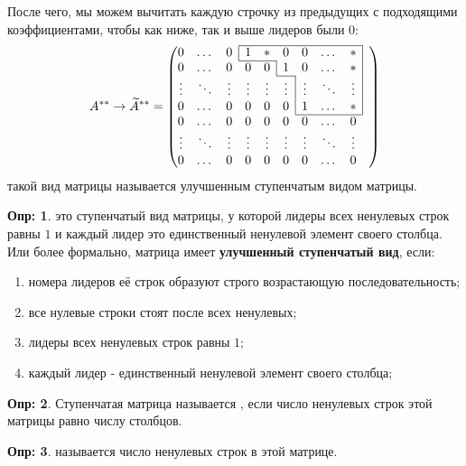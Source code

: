 \documentclass[12pt]{article}
\theoremstyle{definition}
\newtheorem{defn}{Опр:}
\newcommand{\wte}[1]{\widetilde{#1}}
\begin{document}
После чего, мы можем вычитать каждую строчку из предыдущих с подходящими коэффициентами, чтобы как ниже, так и выше лидеров были $0$:
$$
	A^{**} \to \wte{A}^{**} =  
	\begin{pmatrix} \cline{4-9}
		0 & \dotsc & 0 & \multicolumn{1}{|c}{1} & * & 0 & 0 & \dotsc & \multicolumn{1}{c|}{*} & \\ \cline{4-5}
		0 & \dotsc & 0 & 0 & 0 & \multicolumn{1}{|c}{1} & 0 &\dotsc & \multicolumn{1}{c|}{*} & \\  \cline{6-6}
		\vdots & \ddots & \vdots & \vdots & \vdots & \vdots & \multicolumn{1}{|c}{\vdots} & \ddots & \multicolumn{1}{c|}{\vdots} & \\ 
		0 & \dotsc & 0 & 0 & 0 & 0 & \multicolumn{1}{|c}{1} & \dotsc & \multicolumn{1}{c|}{*} & \\ \cline{7-9}
		0 & \dotsc & 0 & 0 & 0 & 0 & 0 & \dotsc & 0 &\\  
		\vdots & \ddots & \vdots & \vdots & \vdots & \vdots & \vdots & \ddots & \vdots& \\  
		0 & \dotsc & 0 & 0 & 0 & 0 & 0 & \dotsc & 0 &\\  
	\end{pmatrix}
$$
такой вид матрицы называется улучшенным ступенчатым видом матрицы.
\begin{defn}
	 это ступенчатый вид матрицы, у которой лидеры всех ненулевых строк равны $1$ и каждый лидер это единственный ненулевой элемент своего столбца. Или более формально, матрица имеет \textbf{улучшенный ступенчатый вид}, если:
	\begin{enumerate}[label=\arabic*)]
		\item номера лидеров её строк образуют строго возрастающую последовательность;
		\item все нулевые строки стоят после всех ненулевых;
		\item лидеры всех ненулевых строк равны $1$;
		\item каждый лидер - единственный ненулевой элемент своего столбца;
	\end{enumerate}
\end{defn}
\begin{defn}
	Ступенчатая матрица называется , если число ненулевых строк этой матрицы равно числу столбцов.
\end{defn}

\begin{defn}
	 называется число ненулевых строк в этой матрице.
\end{defn}
\end{document}
